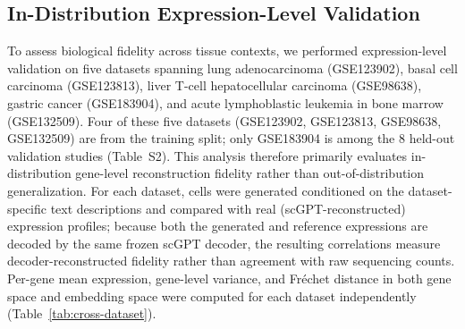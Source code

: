 \documentclass[preprint,12pt]{elsarticle}
\begin{document}
\subsection{In-Distribution Expression-Level Validation}\label{sec:cross-dataset}

To assess biological fidelity across tissue contexts, we performed expression-level validation on five datasets spanning lung adenocarcinoma (GSE123902), basal cell carcinoma (GSE123813), liver T-cell hepatocellular carcinoma (GSE98638), gastric cancer (GSE183904), and acute lymphoblastic leukemia in bone marrow (GSE132509). Four of these five datasets (GSE123902, GSE123813, GSE98638, GSE132509) are from the training split; only GSE183904 is among the 8 held-out validation studies (Table~S2). This analysis therefore primarily evaluates in-distribution gene-level reconstruction fidelity rather than out-of-distribution generalization. For each dataset, cells were generated conditioned on the dataset-specific text descriptions and compared with real (scGPT-reconstructed) expression profiles; because both the generated and reference expressions are decoded by the same frozen scGPT decoder, the resulting correlations measure decoder-reconstructed fidelity rather than agreement with raw sequencing counts. Per-gene mean expression, gene-level variance, and Fr\'{e}chet distance in both gene space and embedding space were computed for each dataset independently (Table~\ref{tab:cross-dataset}).
\end{document}
